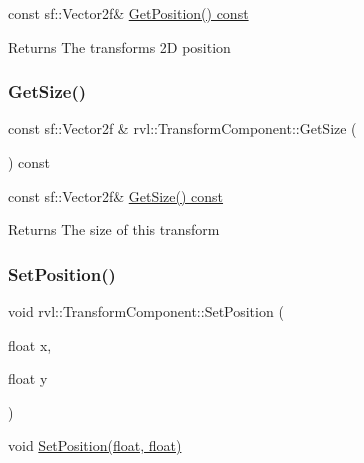 const sf\+::\+Vector2f\& \hyperlink{classrvl_1_1_transform_component_aafd23354a3e3b214569cdb6eedbf0dc1}{Get\+Position() const} 

\begin{DoxyReturn}{Returns}
The transforms 2D position 
\end{DoxyReturn}
\mbox{\label{classrvl_1_1_transform_component_a9f700dd8b95b804157d6c25357959f96}} 
\subsubsection{\texorpdfstring{Get\+Size()}{GetSize()}}
{\footnotesize\ttfamily const sf\+::\+Vector2f \& rvl\+::\+Transform\+Component\+::\+Get\+Size (\begin{DoxyParamCaption}{ }\end{DoxyParamCaption}) const}



const sf\+::\+Vector2f\& \hyperlink{classrvl_1_1_transform_component_a9f700dd8b95b804157d6c25357959f96}{Get\+Size() const} 

\begin{DoxyReturn}{Returns}
The size of this transform 
\end{DoxyReturn}
\mbox{\label{classrvl_1_1_transform_component_aba3ab6e758c936277401e19543d50d06}} 
\subsubsection{\texorpdfstring{Set\+Position()}{SetPosition()}}
{\footnotesize\ttfamily void rvl\+::\+Transform\+Component\+::\+Set\+Position (\begin{DoxyParamCaption}\item[{float}]{x,  }\item[{float}]{y }\end{DoxyParamCaption})}



void \hyperlink{classrvl_1_1_transform_component_aba3ab6e758c936277401e19543d50d06}{Set\+Position(float, float)} 

